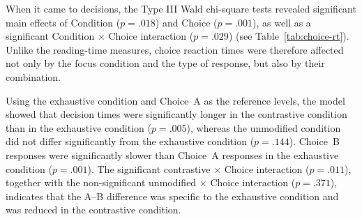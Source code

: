 \documentclass[ruler]{CUP-JNL-LIN}%
\begin{document}
When it came to decisions, the Type III Wald chi-square tests revealed significant main effects of Condition ($p=.018$) and Choice ($p=.001$), as well as a significant Condition $\times$ Choice interaction ($p=.029$) (see Table~\ref{tab:choice-rt}). Unlike the reading-time measures, choice reaction times were therefore affected not only by the focus condition and the type of response, but also by their combination.


Using the exhaustive condition and Choice~A as the reference levels, the model showed that decision times were significantly longer in the contrastive condition than in the exhaustive condition ($p=.005$), whereas the unmodified condition did not differ significantly from the exhaustive condition ($p=.144$). Choice~B responses were significantly slower than Choice~A responses in the exhaustive condition ($p=.001$). The significant contrastive $\times$ Choice interaction ($p=.011$), together with the non-significant unmodified $\times$ Choice interaction ($p=.371$), indicates that the A--B difference was specific to the exhaustive condition and was reduced in the contrastive condition.



\end{document}
